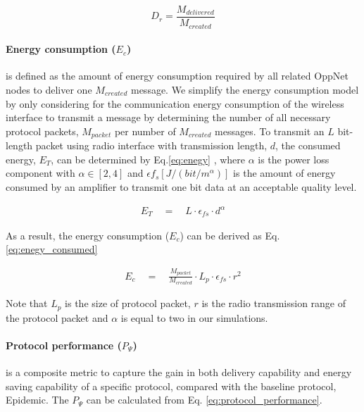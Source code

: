 	\begin{equation}
	\label{delivery_ratio}
	D_{r} =\frac { { M }_{ delivered } }{ { M }_{ created } } 
	\end{equation}

\paragraph{Energy consumption ($E_{c}$)} is defined as the amount of energy consumption required by all related OppNet nodes to deliver one $M_{created}$ message.
We simplify the energy consumption model by only considering for the communication energy consumption of the wireless interface to transmit a message by determining the number of all necessary protocol packets, $M_{packet}$ per number of $M_{created}$ messages.
To transmit an $L$ bit-length packet using radio interface with transmission length, $d$, the consumed energy, ${ E }_{ T }$, can be determined by Eq.\ref{eq:enegy} \cite{Yang2010, Wang2006}, where $\alpha$ is the power loss component with $\alpha \in \left[ 2,4 \right]$ and $\epsilon { f }_{ s }\left[ J/(bit/{ m }^{ \alpha  }) \right]$ is the amount of energy consumed by an amplifier to transmit one bit data at an acceptable quality level.

\begin{eqnarray}
	\label{eq:enegy}
	{ E }_{ T }\quad =\quad L\cdot  { \epsilon  }_{ fs } \cdot  { d }^{ \alpha  }
\end{eqnarray} 

As a result, the energy consumption ($E_c$) can be derived as Eq. \ref{eq:enegy_consumed} 

\begin{eqnarray}
	\label{eq:enegy_consumed}
	{ E }_{ c }\quad =\quad \frac{M_{packet}}{M_{created}} \cdot L_p \cdot  { \epsilon  }_{ fs } \cdot  { r }^{ 2 }
\end{eqnarray} 

Note that $L_p$ is the size of protocol packet, $r$ is the radio transmission range of the protocol packet and $\alpha$ is equal to two in our simulations.
\paragraph{Protocol performance ($P_{\Psi}$)} is a composite metric to capture the gain in both delivery capability and energy saving capability of a specific protocol, compared with the baseline protocol, Epidemic.
The $P_{\Psi}$ can be calculated from Eq. \ref{eq:protocol_performance}.

